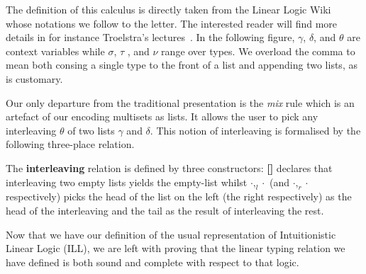 The definition of this calculus is directly taken from the Linear Logic
Wiki~\cite{wiki:linearlogic} whose notations we follow to the letter.
The interested reader will find more details in for instance Troelstra's
lectures~\cite{troelstra1991lectures}. In the following figure, \ensuremath{\gamma}, \ensuremath{\delta},
and \ensuremath{\theta} are context variables while \ensuremath{\sigma}, \ensuremath{\tau} , and \ensuremath{\nu} range over types. We
overload the comma to mean both consing a single type to the front
of a list and appending two lists, as is customary.



Our only departure from the traditional presentation is the \textit{mix}
rule which is an artefact of our encoding multisets as lists. It allows
the user to pick any interleaving \ensuremath{\theta} of two lists \ensuremath{\gamma} and \ensuremath{\delta}. This notion of
interleaving is formalised by the following three-place relation.

\begin{definition} The \textbf{interleaving} relation is defined by three
constructors: \textbf{[]} declares that interleaving two empty lists yields
the empty-list whilst \textbf{$\cdot,_{l}\cdot$} (and \textbf{$\cdot,_{r}\cdot$}
respectively) picks the head of the list on the left (the right respectively)
as the head of the interleaving and the tail as the result of interleaving
the rest.

\end{definition}

Now that we have our definition of the usual representation of Intuitionistic
Linear Logic (ILL), we are left with proving that the linear typing relation
we have defined is both sound and complete with respect to that logic.

